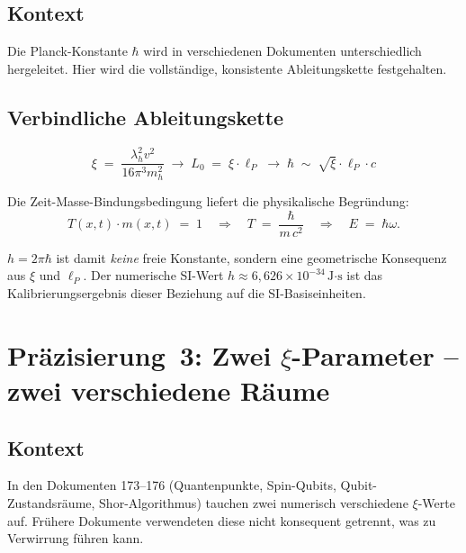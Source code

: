 \subsection*{Kontext}

Die Planck-Konstante $\hbar$ wird in verschiedenen Dokumenten
unterschiedlich hergeleitet. Hier wird die vollständige, konsistente
Ableitungskette festgehalten.

\subsection*{Verbindliche Ableitungskette}

\begin{equation}
  \xi \;=\; \frac{\lambda_h^2 v^2}{16\pi^3 m_h^2}
  \;\longrightarrow\;
  L_0 \;=\; \xi \cdot \ell_P
  \;\longrightarrow\;
  \hbar \;\sim\; \sqrt{\xi}\cdot \ell_P \cdot c
  \tag{190.8}
\end{equation}

Die Zeit-Masse-Bindungsbedingung liefert die physikalische Begründung:
\begin{equation}
  T(x,t)\cdot m(x,t) \;=\; 1
  \quad\Longrightarrow\quad
  T \;=\; \frac{\hbar}{m\, c^2}
  \quad\Longrightarrow\quad
  E \;=\; \hbar\omega.
  \tag{190.9}
\end{equation}

$h = 2\pi\hbar$ ist damit \emph{keine} freie Konstante, sondern eine
geometrische Konsequenz aus $\xi$ und $\ell_P$. Der numerische SI-Wert
$h \approx 6{,}626 \times 10^{-34}\,\text{J·s}$ ist das
Kalibrierungsergebnis dieser Beziehung auf die SI-Basiseinheiten.

\section{\texorpdfstring{Präzisierung~3: Zwei $\xi$-Parameter -- zwei verschiedene Räume}{Praezisierung 3: Zwei xi-Parameter -- zwei verschiedene Raeume}}

\subsection*{Kontext}

In den Dokumenten 173--176 (Quantenpunkte, Spin-Qubits, Qubit-Zustandsräume,
Shor-Algorithmus) tauchen zwei numerisch verschiedene $\xi$-Werte auf.
Frühere Dokumente verwendeten diese nicht konsequent getrennt, was zu
Verwirrung führen kann.

